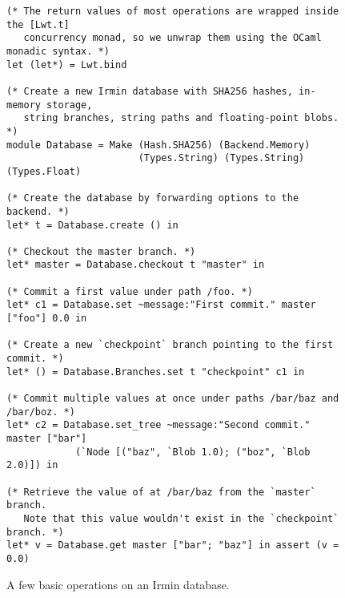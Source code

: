 \begin{figure}[ht]
  \caption{A few basic operations on an Irmin database.}
  \label{lst:irmin-example}

  \centering
  \vspace{-1em}
  \begin{verbatim}
(* The return values of most operations are wrapped inside the [Lwt.t]
   concurrency monad, so we unwrap them using the OCaml monadic syntax. *)
let (let*) = Lwt.bind

(* Create a new Irmin database with SHA256 hashes, in-memory storage,
   string branches, string paths and floating-point blobs. *)
module Database = Make (Hash.SHA256) (Backend.Memory)
                       (Types.String) (Types.String) (Types.Float)

(* Create the database by forwarding options to the backend. *)
let* t = Database.create () in

(* Checkout the master branch. *)
let* master = Database.checkout t "master" in

(* Commit a first value under path /foo. *)
let* c1 = Database.set ~message:"First commit." master ["foo"] 0.0 in

(* Create a new `checkpoint` branch pointing to the first commit. *)
let* () = Database.Branches.set t "checkpoint" c1 in

(* Commit multiple values at once under paths /bar/baz and /bar/boz. *)
let* c2 = Database.set_tree ~message:"Second commit." master ["bar"]
            (`Node [("baz", `Blob 1.0); ("boz", `Blob 2.0)]) in

(* Retrieve the value of at /bar/baz from the `master` branch.
   Note that this value wouldn't exist in the `checkpoint` branch. *)
let* v = Database.get master ["bar"; "baz"] in assert (v = 0.0)
    \end{verbatim}
\end{figure}
